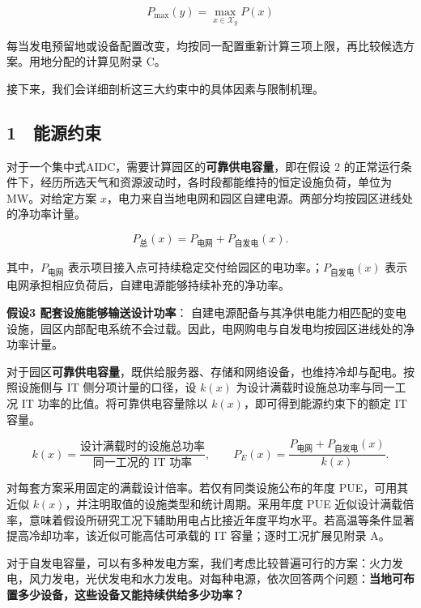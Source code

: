 \[
P_{\max}(y)=\max_{x\in\mathcal X_y}P(x)
\]

每当发电预留地或设备配置改变，均按同一配置重新计算三项上限，再比较候选方案。用地分配的计算见附录 C。

接下来，我们会详细剖析这三大约束中的具体因素与限制机理。

\subsection{1　能源约束}

对于一个集中式AIDC，需要计算园区的\textbf{可靠供电容量}，即在假设 2 的正常运行条件下，经历所选天气和资源波动时，各时段都能维持的恒定设施负荷，单位为 MW。对给定方案 $x$，电力来自当地电网和园区自建电源。两部分均按园区进线处的净功率计量。

\begin{equation}
P_{\text{总}}(x)=P_{\text{电网}}+P_{\text{自发电}}(x).
\tag{1}
\end{equation}

其中，$P_{\text{电网}}$ 表示项目接入点可持续稳定交付给园区的电功率。；$P_{\text{自发电}}(x)$ 表示电网承担相应负荷后，自建电源能够持续补充的净功率。

\begin{asum}
\textbf{假设3 配套设施能够输送设计功率}： 自建电源配备与其净供电能力相匹配的变电设施，园区内部配电系统不会过载。因此，电网购电与自发电均按园区进线处的净功率计量。
\end{asum}

对于园区\textbf{可靠供电容量}，既供给服务器、存储和网络设备，也维持冷却与配电。按照设施侧与 IT 侧分项计量的口径\cite{q1ref01}，设 $k(x)$ 为设计满载时设施总功率与同一工况 IT 功率的比值。将可靠供电容量除以 $k(x)$，即可得到能源约束下的额定 IT 容量。

\begin{equation}
k(x)=\frac{\text{设计满载时的设施总功率}}{\text{同一工况的 IT 功率}},
\qquad
P_E(x)=\frac{P_{\text{电网}}+P_{\text{自发电}}(x)}{k(x)}.
\tag{2}
\end{equation}

\begin{asum}
对每套方案采用固定的满载设计倍率。若仅有同类设施公布的年度 PUE，可用其近似 $k(x)$，并注明取值的设施类型和统计周期。采用年度 PUE 近似设计满载倍率，意味着假设所研究工况下辅助用电占比接近年度平均水平。若高温等条件显著提高冷却功率，该近似可能高估可承载的 IT 容量；逐时工况扩展见附录 A。
\end{asum}

对于自发电容量，可以有多种发电方案，我们考虑比较普遍可行的方案：火力发电，风力发电，光伏发电和水力发电。对每种电源，依次回答两个问题：\textbf{当地可布置多少设备，这些设备又能持续供给多少功率？}

